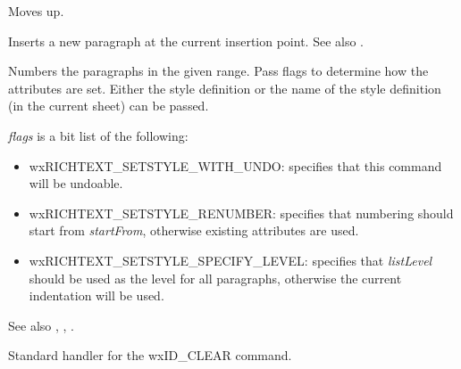 Moves up.

\label{wxrichtextctrlnewline}


Inserts a new paragraph at the current insertion point. See also .

\label{wxrichtextctrlnumberlist}



Numbers the paragraphs in the given range. Pass flags to determine how the attributes are set.
Either the style definition or the name of the style definition (in the current sheet) can be passed.

{\it flags} is a bit list of the following:

\begin{itemize}\itemsep=0pt
\item wxRICHTEXT\_SETSTYLE\_WITH\_UNDO: specifies that this command will be undoable.
\item wxRICHTEXT\_SETSTYLE\_RENUMBER: specifies that numbering should start from {\it startFrom}, otherwise existing attributes are used.
\item wxRICHTEXT\_SETSTYLE\_SPECIFY\_LEVEL: specifies that {\it listLevel} should be used as the level for all paragraphs, otherwise the current indentation will be used.
\end{itemize}

See also , , .

\label{wxrichtextctrlonclear}


Standard handler for the wxID\_CLEAR command.

